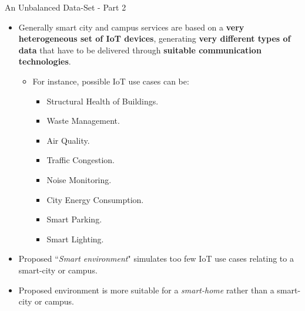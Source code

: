 \documentclass[10pt]{beamer}
\begin{document}
\begin{frame}{An Unbalanced Data-Set - Part 2}

\begin{itemize}
\justifying
\item Generally smart city and campus services are based on a \textbf{very heterogeneous set of IoT devices}, generating \textbf{very different types of data} that have to be delivered through \textbf{suitable communication technologies}.

\begin{itemize}
\item For instance, possible IoT use cases can be:

\begin{itemize}
\item Structural Health of Buildings.
\item Waste Management.
\item Air Quality.
\item Traffic Congestion.
\item Noise Monitoring.
\item City Energy Consumption.
\item Smart Parking.
\item Smart Lighting.
\end{itemize}

\end{itemize}
\end{itemize}

\begin{block}{}
\begin{itemize}
\item Proposed ``\textit{Smart environment}" simulates too few IoT use cases relating to a smart-city or campus.
\item Proposed environment is more suitable for a \textit{smart-home} rather than a smart-city or campus.
\end{itemize}

\end{block}

\end{frame} 
\end{document}
